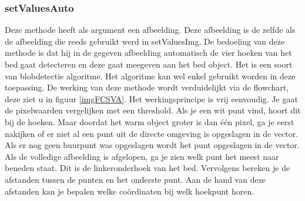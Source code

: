 \subsubsection{setValuesAuto}
Deze methode heeft als argument een afbeelding. Deze afbeelding is de zelfde als de afbeelding die reeds gebruikt werd in setValuesImg. De bedoeling van deze methode is dat hij in de gegeven afbeelding automatisch de vier hoeken van het bed gaat detecteren en deze gaat meegeven aan het bed object. Het is een soort van blobdetectie algoritme. Het algoritme kan wel enkel gebruikt worden in deze toepassing. De werking van deze methode wordt verduidelijkt via de flowchart, deze ziet u in figuur \ref{imgFCSVA}. Het werkingsprincipe is vrij eenvoudig. Je gaat de pixelwaarden vergelijken met een threshold. Als je een wit punt vind, hoort dit bij de hoeken. Maar doordat het warm object groter is dan \'e\'en pixel, ga je eerst nakijken of er niet al een punt uit de directe omgeving is opgeslagen in de vector. Als er nog geen buurpunt was opgeslagen wordt het punt opgeslagen in de vector. Als de volledige afbeelding is afgelopen, ga je zien welk punt het meest naar beneden staat. Dit is de linkeronderhoek van het bed. Vervolgens bereken je de afstanden tussen de punten en het onderste punt. Aan de hand van deze afstanden kan je bepalen welke co\"ordinaten bij welk hoekpunt horen.
